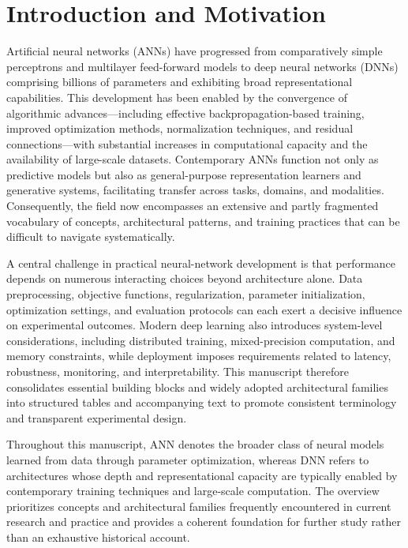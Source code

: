 \documentclass{article}
\begin{document}
\clearpage




\renewcommand{\contentsname}{Table of Contents}

\tableofcontents




\clearpage




\section{Introduction and Motivation}

Artificial neural networks (ANNs) have progressed from comparatively simple perceptrons and multilayer feed-forward models to deep neural networks (DNNs) comprising billions of parameters and exhibiting broad representational capabilities. This development has been enabled by the convergence of algorithmic advances---including effective backpropagation-based training, improved optimization methods, normalization techniques, and residual connections---with substantial increases in computational capacity and the availability of large-scale datasets. Contemporary ANNs function not only as predictive models but also as general-purpose representation learners and generative systems, facilitating transfer across tasks, domains, and modalities. Consequently, the field now encompasses an extensive and partly fragmented vocabulary of concepts, architectural patterns, and training practices that can be difficult to navigate systematically.

A central challenge in practical neural-network development is that performance depends on numerous interacting choices beyond architecture alone. Data preprocessing, objective functions, regularization, parameter initialization, optimization settings, and evaluation protocols can each exert a decisive influence on experimental outcomes. Modern deep learning also introduces system-level considerations, including distributed training, mixed-precision computation, and memory constraints, while deployment imposes requirements related to latency, robustness, monitoring, and interpretability. This manuscript therefore consolidates essential building blocks and widely adopted architectural families into structured tables and accompanying text to promote consistent terminology and transparent experimental design.

Throughout this manuscript, ANN denotes the broader class of neural models learned from data through parameter optimization, whereas DNN refers to architectures whose depth and representational capacity are typically enabled by contemporary training techniques and large-scale computation. The overview prioritizes concepts and architectural families frequently encountered in current research and practice and provides a coherent foundation for further study rather than an exhaustive historical account.
\end{document}
